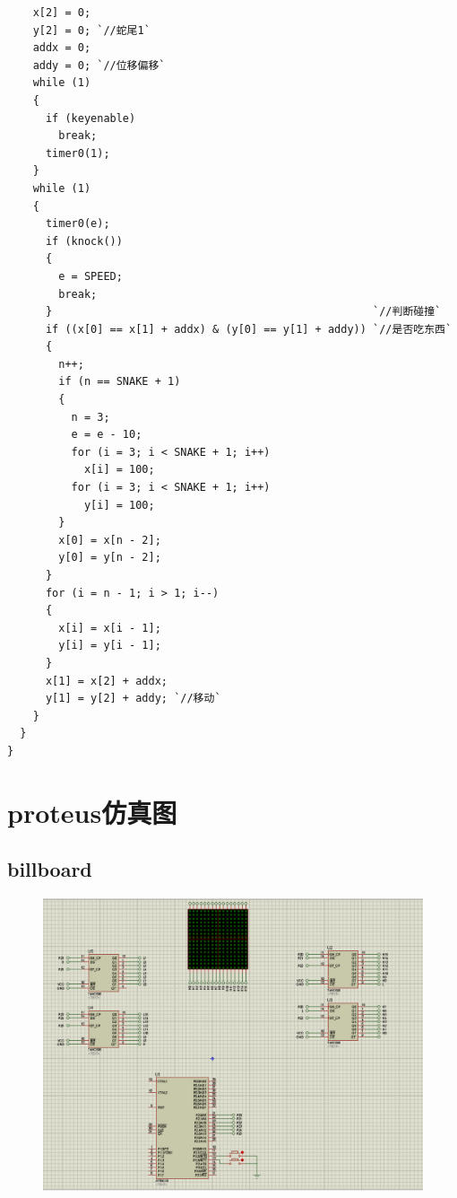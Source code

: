 \documentclass[UTF8]{ctexart}
\begin{document}
\begin{lstlisting}
    x[2] = 0;
    y[2] = 0; `//蛇尾1`
    addx = 0;
    addy = 0; `//位移偏移`
    while (1)
    {
      if (keyenable)
        break;
      timer0(1);
    }
    while (1)
    {
      timer0(e);
      if (knock())
      {
        e = SPEED;
        break;
      }                                                  `//判断碰撞`
      if ((x[0] == x[1] + addx) & (y[0] == y[1] + addy)) `//是否吃东西`
      {
        n++;
        if (n == SNAKE + 1)
        {
          n = 3;
          e = e - 10;
          for (i = 3; i < SNAKE + 1; i++)
            x[i] = 100;
          for (i = 3; i < SNAKE + 1; i++)
            y[i] = 100;
        }
        x[0] = x[n - 2];
        y[0] = y[n - 2];
      }
      for (i = n - 1; i > 1; i--)
      {
        x[i] = x[i - 1];
        y[i] = y[i - 1];
      }
      x[1] = x[2] + addx;
      y[1] = y[2] + addy; `//移动`
    }
  }
}
\end{lstlisting}
\section{proteus仿真图}
\subsection{billboard}
\begin{figure}[ht]
	\centering
	\includegraphics[scale=0.6]{billboard.png}
\end{figure}
\end{document}
